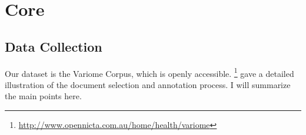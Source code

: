 \chapter{Core}  %

\ifpdf
    \graphicspath{{Core/Figs/Raster/}{Core/Figs/PDF/}{Core/Figs/}}
\else
    \graphicspath{{Core/Figs/Vector/}{Core/Figs/}}
\fi

\section{Data Collection} %
Our dataset is the Variome Corpus\cite{verspoor2013annotating}, which is openly accessible. \footnote{\href{http://www.opennicta.com.au/home/health/variome}\url{http://www.opennicta.com.au/home/health/variome}} \citet{verspoor2013annotating} gave a detailed illustration of the document selection and annotation process. I will summarize the main points here.
